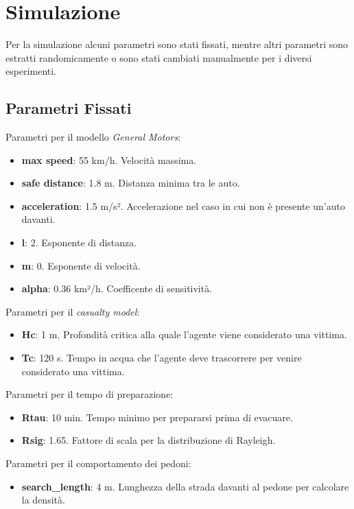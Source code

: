 \section{Simulazione}
\label{sec:simulazione}
Per la simulazione alcuni parametri sono stati fissati, mentre altri parametri sono estratti randomicamente 
o sono stati cambiati manualmente per i diversi esperimenti.

\subsection{Parametri Fissati}
\label{ssec:parametri-fissi}

Parametri per il modello \textit{General Motors}:
\begin{itemize}
    \item \textbf{max speed}: 55 km/h. Velocità massima.
    \item \textbf{safe distance}: 1.8 m. Distanza minima tra le auto.
    \item \textbf{acceleration}: 1.5 m/s². Accelerazione nel caso in cui non è presente un'auto davanti.
    \item \textbf{l}: 2. Esponente di distanza.
    \item \textbf{m}: 0. Esponente di velocità.
    \item \textbf{alpha}: 0.36 km²/h. Coefficente di sensitività. 
\end{itemize}

\noindent
Parametri per il \textit{casualty model}:
\begin{itemize}
  \item \textbf{Hc}: 1 m. Profondità critica alla quale l'agente viene considerato una vittima.
  \item \textbf{Tc}: 120 s. Tempo in acqua che l'agente deve trascorrere per venire considerato una vittima. 
\end{itemize}

\noindent
Parametri per il tempo di preparazione:
\begin{itemize}
  \item \textbf{Rtau}: 10 min. Tempo minimo per prepararsi prima di evacuare.
  \item \textbf{Rsig}: 1.65. Fattore di scala per la distribuzione di Rayleigh.
\end{itemize}

\noindent
Parametri per il comportamento dei pedoni:
\begin{itemize}
  \item \textbf{search\_length}: 4 m. Lunghezza della strada davanti al pedone per calcolare la densità.
\end{itemize}


